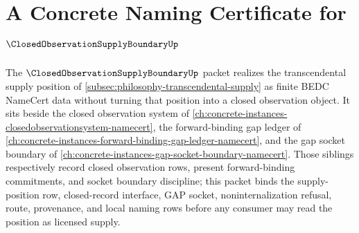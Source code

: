 \chapter{A Concrete Naming Certificate for $\ClosedObservationSupplyBoundaryUp$}
\label{ch:concrete-instances-closed-observation-supply-boundary-namecert}

The $\ClosedObservationSupplyBoundaryUp$ packet realizes the transcendental supply position of \autoref{subsec:philosophy-transcendental-supply} as finite BEDC NameCert data without turning that position into a closed observation object. It sits beside the closed observation system of \autoref{ch:concrete-instances-closedobservationsystem-namecert}, the forward-binding gap ledger of \autoref{ch:concrete-instances-forward-binding-gap-ledger-namecert}, and the gap socket boundary of \autoref{ch:concrete-instances-gap-socket-boundary-namecert}. Those siblings respectively record closed observation rows, present forward-binding commitments, and socket boundary discipline; this packet binds the supply-position row, closed-record interface, GAP socket, noninternalization refusal, route, provenance, and local naming rows before any consumer may read the position as licensed supply.

